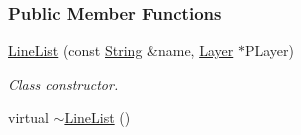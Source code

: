 \subsubsection*{Public Member Functions}
\begin{DoxyCompactItemize}
\item 
\hyperlink{classMezzanine_1_1UI_1_1LineList_ad2401759d54e6cce32160e31a272e463}{LineList} (const \hyperlink{namespaceMezzanine_acf9fcc130e6ebf08e3d8491aebcf1c86}{String} \&name, \hyperlink{classMezzanine_1_1UI_1_1Layer}{Layer} $\ast$PLayer)
\begin{DoxyCompactList}\small\item\em Class constructor. \item\end{DoxyCompactList}\item 
\hypertarget{classMezzanine_1_1UI_1_1LineList_a1b87085b800ead91bc1bfec4d133039b}{
virtual \hyperlink{classMezzanine_1_1UI_1_1LineList_a1b87085b800ead91bc1bfec4d133039b}{$\sim$LineList} ()}
\label{classMezzanine_1_1UI_1_1LineList_a1b87085b800ead91bc1bfec4d133039b}


\end{DoxyCompactItemize}
